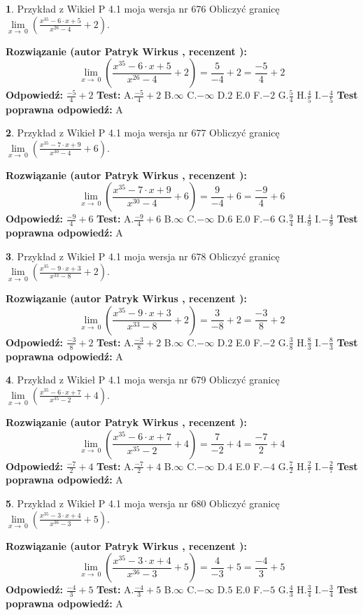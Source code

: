 \documentclass[12pt, a4paper]{article}
\theoremstyle{definition} %
\newtheorem{zad}{}
\newcommand{\zadStart}[1]{\begin{zad}#1\newline}
\newcommand{\zadStop}{\end{zad}}
\newcommand{\rozwStart}[2]{\noindent \textbf{Rozwiązanie (autor #1 , recenzent #2): }\newline}
\newcommand{\rozwStop}{\newline}
\newcommand{\odpStart}{\noindent \textbf{Odpowiedź:}\newline}
\newcommand{\odpStop}{\newline}
\newcommand{\testStart}{\noindent \textbf{Test:}\newline}
\newcommand{\testStop}{\newline}
\newcommand{\kluczStart}{\noindent \textbf{Test poprawna odpowiedź:}\newline}
\newcommand{\kluczStop}{\newline}
\begin{document}
\zadStart{Przykład z Wikieł P 4.1 moja wersja nr 676}
Obliczyć granicę $\lim\limits_{x\to\ 0}(\frac{x^{35}-6 \cdot x +5}{x^{26}-4}+2)$.
\zadStop
\rozwStart{Patryk Wirkus}{}
$$\lim\limits_{x\to\ 0}(\frac{x^{35}-6 \cdot x +5}{x^{26}-4}+2)=\frac{5}{-4}+2=\frac{-5}{4}+2$$
\rozwStop
\odpStart
$\frac{-5}{4}+2$
\odpStop
\testStart
A.$\frac{-5}{4}+2$
B.$\infty$
C.$-\infty$
D.$2$
E.$0$
F.$-2$
G.$\frac{5}{4}$
H.$\frac{4}{5}$
I.$-\frac{4}{5}$
\testStop
\kluczStart
A
\kluczStop



\zadStart{Przykład z Wikieł P 4.1 moja wersja nr 677}
Obliczyć granicę $\lim\limits_{x\to\ 0}(\frac{x^{35}-7 \cdot x +9}{x^{30}-4}+6)$.
\zadStop
\rozwStart{Patryk Wirkus}{}
$$\lim\limits_{x\to\ 0}(\frac{x^{35}-7 \cdot x +9}{x^{30}-4}+6)=\frac{9}{-4}+6=\frac{-9}{4}+6$$
\rozwStop
\odpStart
$\frac{-9}{4}+6$
\odpStop
\testStart
A.$\frac{-9}{4}+6$
B.$\infty$
C.$-\infty$
D.$6$
E.$0$
F.$-6$
G.$\frac{9}{4}$
H.$\frac{4}{9}$
I.$-\frac{4}{9}$
\testStop
\kluczStart
A
\kluczStop



\zadStart{Przykład z Wikieł P 4.1 moja wersja nr 678}
Obliczyć granicę $\lim\limits_{x\to\ 0}(\frac{x^{35}-9 \cdot x +3}{x^{33}-8}+2)$.
\zadStop
\rozwStart{Patryk Wirkus}{}
$$\lim\limits_{x\to\ 0}(\frac{x^{35}-9 \cdot x +3}{x^{33}-8}+2)=\frac{3}{-8}+2=\frac{-3}{8}+2$$
\rozwStop
\odpStart
$\frac{-3}{8}+2$
\odpStop
\testStart
A.$\frac{-3}{8}+2$
B.$\infty$
C.$-\infty$
D.$2$
E.$0$
F.$-2$
G.$\frac{3}{8}$
H.$\frac{8}{3}$
I.$-\frac{8}{3}$
\testStop
\kluczStart
A
\kluczStop



\zadStart{Przykład z Wikieł P 4.1 moja wersja nr 679}
Obliczyć granicę $\lim\limits_{x\to\ 0}(\frac{x^{35}-6 \cdot x +7}{x^{35}-2}+4)$.
\zadStop
\rozwStart{Patryk Wirkus}{}
$$\lim\limits_{x\to\ 0}(\frac{x^{35}-6 \cdot x +7}{x^{35}-2}+4)=\frac{7}{-2}+4=\frac{-7}{2}+4$$
\rozwStop
\odpStart
$\frac{-7}{2}+4$
\odpStop
\testStart
A.$\frac{-7}{2}+4$
B.$\infty$
C.$-\infty$
D.$4$
E.$0$
F.$-4$
G.$\frac{7}{2}$
H.$\frac{2}{7}$
I.$-\frac{2}{7}$
\testStop
\kluczStart
A
\kluczStop



\zadStart{Przykład z Wikieł P 4.1 moja wersja nr 680}
Obliczyć granicę $\lim\limits_{x\to\ 0}(\frac{x^{35}-3 \cdot x +4}{x^{36}-3}+5)$.
\zadStop
\rozwStart{Patryk Wirkus}{}
$$\lim\limits_{x\to\ 0}(\frac{x^{35}-3 \cdot x +4}{x^{36}-3}+5)=\frac{4}{-3}+5=\frac{-4}{3}+5$$
\rozwStop
\odpStart
$\frac{-4}{3}+5$
\odpStop
\testStart
A.$\frac{-4}{3}+5$
B.$\infty$
C.$-\infty$
D.$5$
E.$0$
F.$-5$
G.$\frac{4}{3}$
H.$\frac{3}{4}$
I.$-\frac{3}{4}$
\testStop
\kluczStart
A
\kluczStop
\end{document}
